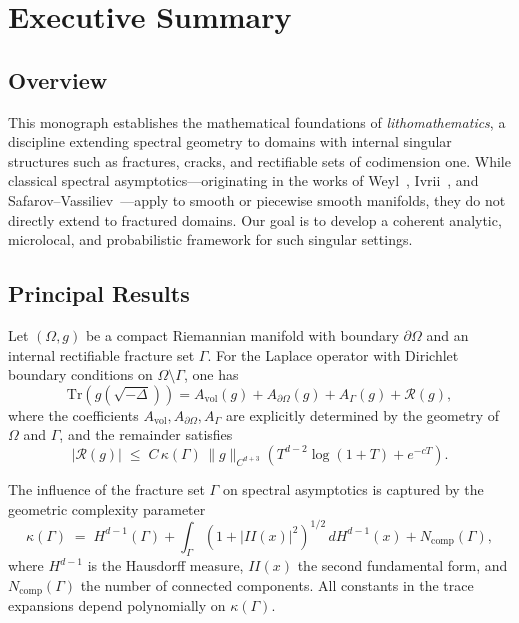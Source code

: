 
\chapter*{Executive Summary}
\label{chap:executive-summary}

\section*{Overview}

This monograph establishes the mathematical foundations of 
\emph{lithomathematics}, a discipline extending spectral geometry to domains 
with internal singular structures such as fractures, cracks, and rectifiable 
sets of codimension one. While classical spectral asymptotics---originating 
in the works of Weyl~\cite{Weyl1911}, Ivrii~\cite{Ivrii1980}, and 
Safarov--Vassiliev~\cite{SafarovVassiliev1997}---apply to smooth or piecewise 
smooth manifolds, they do not directly extend to fractured domains. 
Our goal is to develop a coherent analytic, microlocal, and probabilistic 
framework for such singular settings.

\section*{Principal Results}

\begin{theorem}
Let $(\Omega,g)$ be a compact Riemannian manifold with boundary 
$\partial\Omega$ and an internal rectifiable fracture set $\Gamma$. 
For the Laplace operator with Dirichlet boundary conditions on 
$\Omega\setminus\Gamma$, one has
\[
    \mathrm{Tr}(g(\sqrt{-\Delta})) 
    = A_{\mathrm{vol}}(g) + A_{\partial\Omega}(g) + A_{\Gamma}(g) + \mathcal{R}(g),
\]
where the coefficients $A_{\mathrm{vol}}, A_{\partial\Omega}, A_{\Gamma}$ are 
explicitly determined by the geometry of $\Omega$ and $\Gamma$, and the 
remainder satisfies
\[
    |\mathcal{R}(g)| 
    \;\leq\; C\,\kappa(\Gamma)\,\|g\|_{C^{d+3}}
        \left( T^{d-2}\log(1+T) + e^{-cT}\right).
\]
\end{theorem}

\begin{theorem}
The influence of the fracture set $\Gamma$ on spectral asymptotics is 
captured by the geometric complexity parameter
\[
    \kappa(\Gamma) \;=\; 
        H^{d-1}(\Gamma) 
        + \int_\Gamma (1+|II(x)|^2)^{1/2}\,dH^{d-1}(x) 
        + N_{\mathrm{comp}}(\Gamma),
\]
where $H^{d-1}$ is the Hausdorff measure, $II(x)$ the second fundamental form, 
and $N_{\mathrm{comp}}(\Gamma)$ the number of connected components. 
All constants in the trace expansions depend polynomially on $\kappa(\Gamma)$.
\end{theorem}

